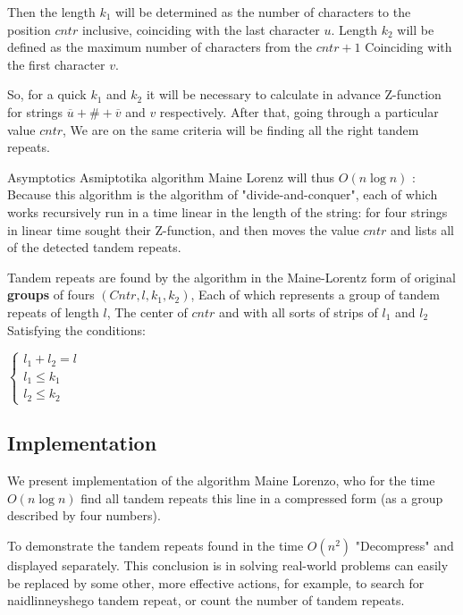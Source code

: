 Then the length $k_1$ will be determined as the number of characters to the position $cntr$ inclusive, coinciding with the last character $u$. Length $k_2$ will be defined as the maximum number of characters from the $cntr +1$ Coinciding with the first character $v$.

So, for a quick $k_1$ and $k_2$ it will be necessary to calculate in advance Z-function for strings $\overline {u} + \# + \overline {v}$ and $v$ respectively. After that, going through a particular value $cntr$, We are on the same criteria will be finding all the right tandem repeats.

Asymptotics
Asmiptotika algorithm Maine Lorenz will thus $O (n \log n)$ : Because this algorithm is the algorithm of "divide-and-conquer", each of which works recursively run in a time linear in the length of the string: for four strings in linear time sought their Z-function, and then moves the value $cntr$ and lists all of the detected tandem repeats.

Tandem repeats are found by the algorithm in the Maine-Lorentz form of original \textbf{groups} of fours $(Cntr, l, k_1, k_2)$, Each of which represents a group of tandem repeats of length $l$, The center of $cntr$ and with all sorts of strips of $l_1$ and $l_2$ Satisfying the conditions:

$\begin{cases}
l_{1}+l_{2}=l\\
l_{1}\leq k_{1}\\
l_{2}\leq k_{2}
\end{cases}$

\subsection{ Implementation }

We present implementation of the algorithm Maine Lorenzo, who for the time $O (n \log n)$ find all tandem repeats this line in a compressed form (as a group described by four numbers).

To demonstrate the tandem repeats found in the time $O (n ^ 2)$ "Decompress" and displayed separately. This conclusion is in solving real-world problems can easily be replaced by some other, more effective actions, for example, to search for naidlinneyshego tandem repeat, or count the number of tandem repeats.

